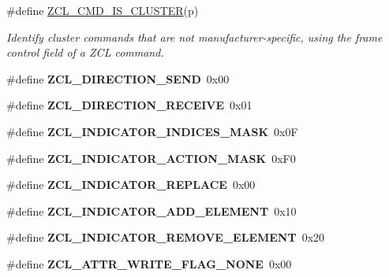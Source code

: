 \begin{DoxyCompactItemize}
\#define \hyperlink{group__zcl_gacf3dd5326c4c70dcca078b1eae0c3661}{Z\+C\+L\+\_\+\+C\+M\+D\+\_\+\+I\+S\+\_\+\+C\+L\+U\+S\+T\+ER}(p)
\begin{DoxyCompactList}\small\item\em Identify cluster commands that are not manufacturer-\/specific, using the frame control field of a Z\+CL command. \end{DoxyCompactList}\item 
\mbox{\label{group__zcl_gad579227f53a05118d43fccab9a651cd7}} 
\#define {\bfseries Z\+C\+L\+\_\+\+D\+I\+R\+E\+C\+T\+I\+O\+N\+\_\+\+S\+E\+ND}~0x00
\item 
\mbox{\label{group__zcl_gad5c68f751f625199d813004d16a77d30}} 
\#define {\bfseries Z\+C\+L\+\_\+\+D\+I\+R\+E\+C\+T\+I\+O\+N\+\_\+\+R\+E\+C\+E\+I\+VE}~0x01
\item 
\mbox{\label{group__zcl_ga6853d1fba6ab5e122dee4befe8e6d5e6}} 
\#define {\bfseries Z\+C\+L\+\_\+\+I\+N\+D\+I\+C\+A\+T\+O\+R\+\_\+\+I\+N\+D\+I\+C\+E\+S\+\_\+\+M\+A\+SK}~0x0F
\item 
\mbox{\label{group__zcl_ga90d8c7d7dc7b8aa4b27ab1a8a3656ee3}} 
\#define {\bfseries Z\+C\+L\+\_\+\+I\+N\+D\+I\+C\+A\+T\+O\+R\+\_\+\+A\+C\+T\+I\+O\+N\+\_\+\+M\+A\+SK}~0x\+F0
\item 
\mbox{\label{group__zcl_ga708c678fc0321c8f3cfdc6faac3dbf33}} 
\#define {\bfseries Z\+C\+L\+\_\+\+I\+N\+D\+I\+C\+A\+T\+O\+R\+\_\+\+R\+E\+P\+L\+A\+CE}~0x00
\item 
\mbox{\label{group__zcl_gada825912c939a0b47ab998f1b64d1e4f}} 
\#define {\bfseries Z\+C\+L\+\_\+\+I\+N\+D\+I\+C\+A\+T\+O\+R\+\_\+\+A\+D\+D\+\_\+\+E\+L\+E\+M\+E\+NT}~0x10
\item 
\mbox{\label{group__zcl_ga0793be06976a8d352c95a532761e66d7}} 
\#define {\bfseries Z\+C\+L\+\_\+\+I\+N\+D\+I\+C\+A\+T\+O\+R\+\_\+\+R\+E\+M\+O\+V\+E\+\_\+\+E\+L\+E\+M\+E\+NT}~0x20
\item 
\mbox{\label{group__zcl_ga3e55f9168585bd3f3012da69348c7e4e}} 
\#define {\bfseries Z\+C\+L\+\_\+\+A\+T\+T\+R\+\_\+\+W\+R\+I\+T\+E\+\_\+\+F\+L\+A\+G\+\_\+\+N\+O\+NE}~0x00
\item 

\end{DoxyCompactItemize}
